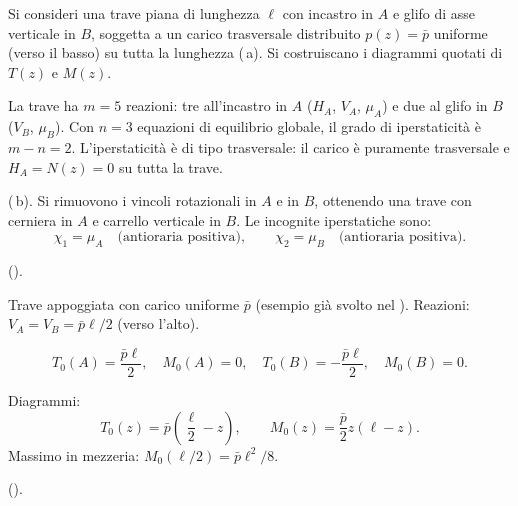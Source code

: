 \begin{esempio}
	Si consideri una trave piana di lunghezza $\ell$
	con incastro in $A$ e glifo di asse verticale
	in $B$, soggetta a un carico trasversale
	distribuito $p(z) = \bar{p}$ uniforme (verso
	il basso) su tutta la lunghezza
	(\,a).
	Si costruiscano i diagrammi quotati di $T(z)$ e $M(z)$.
	
	\begin{svolgimento}
		



		
		
		La trave ha $m = 5$ reazioni: tre all'incastro
		in $A$ ($H_A$, $V_A$, $\mu_A$) e due al glifo
		in $B$ ($V_B$, $\mu_B$). Con $n = 3$ equazioni
		di equilibrio globale, il grado di iperstaticità
		è $m - n = 2$. L'iperstaticità è di tipo
		trasversale: il carico è puramente trasversale
		e $H_A = N(z) = 0$ su tutta la trave.
		
		(\,b).
		Si rimuovono i vincoli rotazionali in $A$ e
		in $B$, ottenendo una trave con cerniera in
		$A$ e carrello verticale in $B$. Le incognite
		iperstatiche sono:
		\[
		\chi_1 = \mu_A \quad\text{(antioraria
			positiva)}, \qquad
		\chi_2 = \mu_B \quad\text{(antioraria
			positiva)}.
		\]
		
		().
		



		
		
		Trave appoggiata con carico uniforme $\bar{p}$
		(esempio già svolto nel
		).
		Reazioni: $V_A = V_B = \bar{p}\ell/2$
		(verso l'alto).
		
		\[
		T_0(A) = \frac{\bar{p}\ell}{2}, \quad
		M_0(A) = 0, \quad
		T_0(B) = -\frac{\bar{p}\ell}{2}, \quad
		M_0(B) = 0.
		\]
		
		Diagrammi:
		\[
		T_0(z) = \bar{p}\!\left(\frac{\ell}{2} - z\right),
		\qquad
		M_0(z) = \frac{\bar{p}}{2}z(\ell - z).
		\]
		Massimo in mezzeria: $M_0(\ell/2) =
		\bar{p}\ell^2/8$.
		
		().
		

\end{svolgimento}
\end{esempio}
